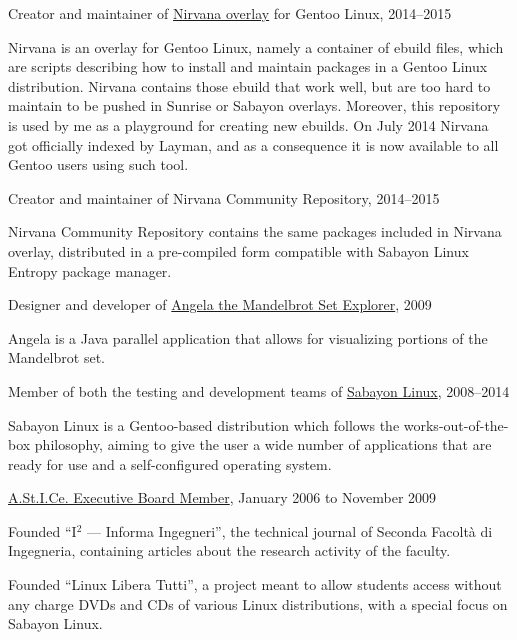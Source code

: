 \documentclass[10pt]{article}
\newenvironment{innerlist}[1][\enskip\textbullet]%
        {\begin{compactitem}[#1]}{\end{compactitem}}
\newcommand{\halfblankline}{\quad\vspace{-0.5\baselineskip}\pagebreak[3]}
\begin{document}
Creator and maintainer of \href{https://bitbucket.org/danysk/nirvana-overlay/}{Nirvana overlay} for Gentoo Linux, 2014--2015
\begin{innerlist}
    \item Nirvana is an overlay for Gentoo Linux, namely a container of ebuild files, which are scripts describing how to install and maintain packages in a Gentoo Linux distribution. Nirvana contains those ebuild that work well, but are too hard to maintain to be pushed in Sunrise or Sabayon overlays. Moreover, this repository is used by me as a playground for creating new ebuilds. On July 2014 Nirvana got officially indexed by Layman, and as a consequence it is now available to all Gentoo users using such tool.
\end{innerlist}
\halfblankline

Creator and maintainer of {Nirvana Community Repository}, 2014--2015
\begin{innerlist}
    \item Nirvana Community Repository contains the same packages included in Nirvana overlay, distributed in a pre-compiled form compatible with Sabayon Linux Entropy package manager.
\end{innerlist}
\halfblankline

Designer and developer of \href{https://sourceforge.net/projects/mandelbrot/}{Angela the Mandelbrot Set Explorer}, 2009
\begin{innerlist}
  \item Angela is a Java parallel application that allows for visualizing portions of the Mandelbrot set.
\end{innerlist}
\halfblankline

Member of both the testing and development teams of \href{http://www.sabayon.org/}{Sabayon Linux}, 2008--2014
\begin{innerlist}
  \item Sabayon Linux is a Gentoo-based distribution which follows the works-out-of-the-box philosophy, aiming to give the user a wide number of applications that are ready for use and a self-configured operating system.
\end{innerlist}
\halfblankline

\href{http://www.astice.org/}{A.St.I.Ce. Executive Board Member}, January 2006 to November 2009
    \begin{innerlist}
      \item Founded ``I$^2$ --- Informa Ingegneri'', the technical journal of Seconda Facoltà di Ingegneria, containing articles about the research activity of the faculty.
      \item Founded ``Linux Libera Tutti'', a project meant to allow students access without any charge DVDs and CDs of various Linux distributions, with a special focus on Sabayon Linux.
    \end{innerlist}
\halfblankline
\end{document}
